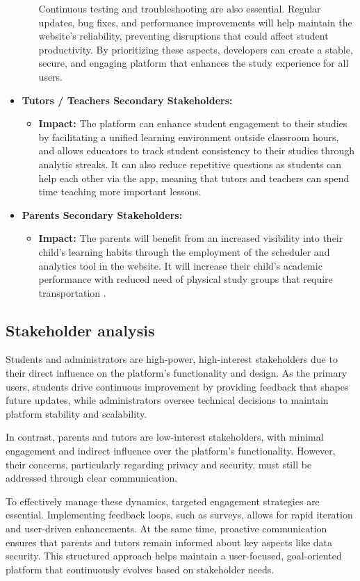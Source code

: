 \begin{itemize}
\begin{itemize}
        Continuous testing and troubleshooting are also essential. Regular updates, bug fixes, and performance improvements will help maintain the website’s reliability, preventing disruptions that could affect student productivity. By prioritizing these aspects, developers can create a stable, secure, and engaging platform that enhances the study experience for all users.
    \end{itemize}

    \item \textbf{Tutors / Teachers {Secondary Stakeholders}:}
    \begin{itemize}
        \item \textbf{Impact:} The platform can enhance student engagement to their studies by facilitating a unified learning environment outside classroom hours, and allows educators to track student consistency to their studies through analytic streaks. It can also reduce repetitive questions as students can help each other via the app, meaning that tutors and teachers can spend time teaching more important lessons.
    \end{itemize}

    \item \textbf{Parents {Secondary Stakeholders}:}
    \begin{itemize}
        \item \textbf{Impact:} The parents will benefit from an increased visibility into their child's learning habits through the employment of the scheduler and analytics tool in the website. It will increase their child's academic performance with reduced need of physical study groups that require transportation .
    \end{itemize}
\end{itemize}  

\subsection{Stakeholder analysis}
Students and administrators are high-power, high-interest stakeholders due to their direct influence on the platform’s functionality and design. As the primary users, students drive continuous improvement by providing feedback that shapes future updates, while administrators oversee technical decisions to maintain platform stability and scalability.  

In contrast, parents and tutors are low-interest stakeholders, with minimal engagement and indirect influence over the platform’s functionality. However, their concerns, particularly regarding privacy and security, must still be addressed through clear communication.  

To effectively manage these dynamics, targeted engagement strategies are essential. Implementing feedback loops, such as surveys, allows for rapid iteration and user-driven enhancements. At the same time, proactive communication ensures that parents and tutors remain informed about key aspects like data security. This structured approach helps maintain a user-focused, goal-oriented platform that continuously evolves based on stakeholder needs.
